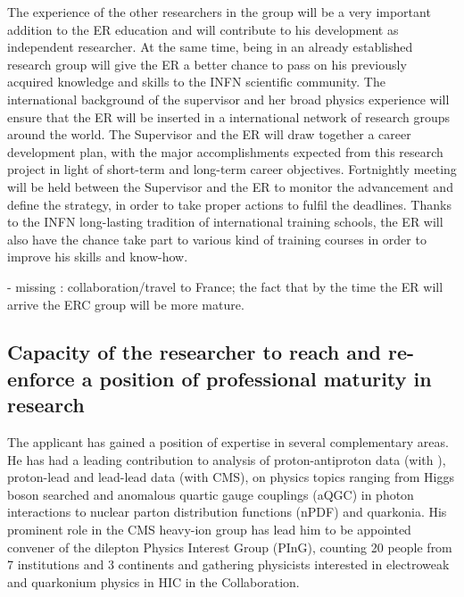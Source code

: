 \documentclass[a4paper,11pt]{article}
\begin{document}
   The experience of the other
researchers in the group will be a very important addition to the ER
education and will contribute to his development as independent
researcher. At the same time, being in an already established research
group will give the ER a better chance to pass on his previously
acquired knowledge and skills to the INFN scientific community. 
The international background of the supervisor and her 
broad physics experience will ensure that the 
ER will be inserted in a international network of 
research groups around the world.  The
Supervisor and the ER will draw together a career development plan,
with the major accomplishments expected from this research project in
light of short-term and long-term career objectives. Fortnightly
meeting will be held between the Supervisor and the ER to monitor the
advancement and define the strategy, in order to take proper actions
to fulfil the deadlines. Thanks to the INFN long-lasting tradition of
international training schools, the ER will also have the chance take
part to various kind of training courses in order to improve his
skills and know-how.  

- missing : collaboration/travel to France; the fact that by the time
the ER will arrive the ERC group will be more mature. %

%              
            

\subsection{Capacity of the researcher to reach and re-enforce a position of professional maturity in research}
\label{sec:maturity}

The applicant has gained a position of expertise in several complementary areas. He has had a leading contribution to analysis of proton-antiproton data (with \DO), proton-lead and lead-lead data (with CMS), on physics topics ranging from Higgs boson searched and anomalous quartic gauge couplings (aQGC) in photon interactions to nuclear parton distribution functions (nPDF) and quarkonia. His prominent role in the CMS heavy-ion group has lead him to be appointed convener of the dilepton Physics Interest Group (PInG), counting 20 people from 7 institutions and 3 continents and gathering physicists interested in electroweak and quarkonium physics in HIC in the Collaboration.
\end{document}
